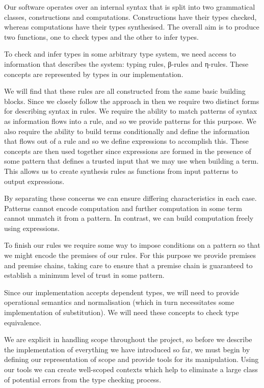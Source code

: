 Our software operates over an internal syntax that is split into two
grammatical classes, constructions and computations. Constructions
have their types checked, whereas computations have their types
synthesised. The overall aim is to produce two functions, one to check
types and the other to infer types. 

To check and infer types in some arbitrary type system, we need access
to information that describes the system: typing rules, β-rules and
η-rules. These concepts are represented by types in our implementation. 

We will find that these rules are all constructed from the same basic
building blocks. Since we closely follow the approach in \cite{TypesWhoSayNi} then
we require two distinct forms for describing syntax in rules. We
require the ability to match patterns of syntax as information flows
into a rule, and so we provide patterns for this purpose. We also
require the ability to build terms conditionally and define the
information that flows out of a rule and so we define expressions to
accomplish this. These concepts are then used together since
expressions are formed in the presence of some pattern that defines a
trusted input that we may use when building a term. This allows us to
create synthesis rules as functions from input patterns to output
expressions. 

By separating these concerns we can ensure differing characteristics
in each case. Patterns cannot encode computation and further
computation in some term cannot unmatch it from a pattern. In
contrast, we can build computation freely using expressions. 

To finish our rules we require some way to impose conditions on a
pattern so that we might encode the premises of our rules. For this
purpose we provide premises and premise chains, taking care to ensure
that a premise chain is guaranteed to establish a minimum level of
trust in some pattern. 

Since our implementation accepts dependent types, we will need to
provide operational semantics and normalisation (which in turn
necessitates some implementation of substitution). We will need these
concepts to check type equivalence.  

We are explicit in handling scope throughout the project, so before we
describe the implementation of everything we have introduced so far,
we must begin by defining our representation of scope and provide
tools for its manipulation. Using our tools we can create well-scoped
contexts which help to eliminate a large class of potential errors
from the type checking process.


